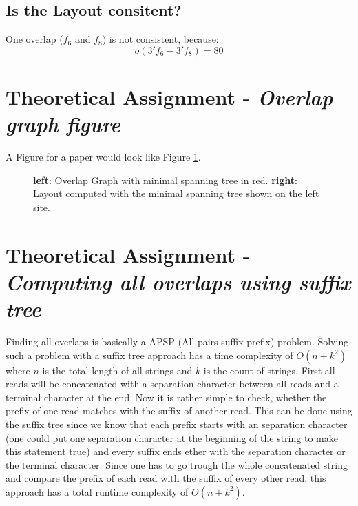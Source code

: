 \documentclass[%
   10pt,              %
   ngerman,           %
   a4paper,           %
   DIV11,             %
]{scrartcl}%
\begin{document}
\subsection*{Is the Layout consitent?}
One overlap ($f_6$ and $f_8$) is not consistent, because:
\begin{equation*}
o(3'f_6 - 3'f_8)=80
\end{equation*}
\section*{Theoretical Assignment - \textit{Overlap graph figure}}
 
A Figure for a paper would look like Figure \ref{fig:paper}.

\begin{figure}[h]
	\centering
	\caption{\textbf{left}: Overlap Graph with minimal spanning tree in red. \textbf{right}: Layout computed with the minimal spanning tree shown on the left site.}
	\label{fig:paper}
\end{figure} 
 
\section*{Theoretical Assignment - \textit{Computing all overlaps using suffix tree}}

Finding all overlaps is basically a APSP (All-pairs-suffix-prefix) problem. Solving such a problem 
with a suffix tree approach has a time complexity of $O(n + k^2)$ where $n$ is the total length of 
all strings and $k$ is the count of strings. First all reads will be concatenated with a separation 
character between all reads and a terminal character at the end. Now it is rather simple to check, 
whether the prefix of one read matches with the suffix of another read. This can be done using the 
suffix tree since we know that each prefix starts with an separation character (one could put one 
separation character at the beginning of the string to make this statement true) and every suffix 
ends ether with the separation character or the terminal character. Since one has to go trough the 
whole concatenated string and compare the prefix of each read with the suffix of every other read, 
this approach has a total runtime complexity of $O(n+k^2)$.
\end{document}
